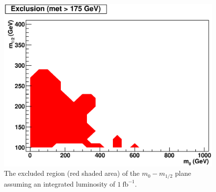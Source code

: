 \begin{figure}[htb]
\begin{center}
\includegraphics[width=0.7\linewidth]{figs/hexc175_1fb.eps}
\caption{The excluded region (red  shaded area) of the $m_{0}-m_{1/2}$
plane       assuming      an       integrated       luminosity      of
$1~\mathrm{fb}^{-1}$. \label{fig:exc1fb}}
\end{center}
\end{figure}
